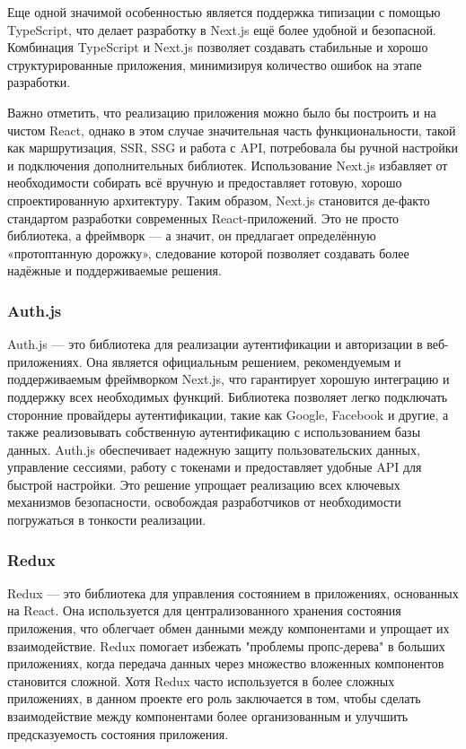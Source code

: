 Еще одной значимой особенностью является поддержка типизации с помощью TypeScript, что делает разработку в Next.js ещё более удобной и безопасной. Комбинация TypeScript и Next.js позволяет создавать стабильные и хорошо структурированные приложения, минимизируя количество ошибок на этапе разработки.

Важно отметить, что реализацию приложения можно было бы построить и на чистом React, однако в этом случае значительная часть функциональности, такой как маршрутизация, SSR, SSG и работа с API, потребовала бы ручной настройки и подключения дополнительных библиотек. Использование Next.js избавляет от необходимости собирать всё вручную и предоставляет готовую, хорошо спроектированную архитектуру. Таким образом, Next.js становится де-факто стандартом разработки современных React-приложений. Это не просто библиотека, а фреймворк — а значит, он предлагает определённую «протоптанную дорожку», следование которой позволяет создавать более надёжные и поддерживаемые решения.

\subsubsection*{Auth.js}
Auth.js --- это библиотека для реализации аутентификации и авторизации в веб-приложениях. Она является официальным решением, рекомендуемым и поддерживаемым фреймворком Next.js, что гарантирует хорошую интеграцию и поддержку всех необходимых функций. Библиотека позволяет легко подключать сторонние провайдеры аутентификации, такие как Google, Facebook и другие, а также реализовывать собственную аутентификацию с использованием базы данных. Auth.js обеспечивает надежную защиту пользовательских данных, управление сессиями, работу с токенами и предоставляет удобные API для быстрой настройки. Это решение упрощает реализацию всех ключевых механизмов безопасности, освобождая разработчиков от необходимости погружаться в тонкости реализации.

\subsubsection*{Redux}
Redux --- это библиотека для управления состоянием в приложениях, основанных на React. Она используется для централизованного хранения состояния приложения, что облегчает обмен данными между компонентами и упрощает их взаимодействие. Redux помогает избежать "проблемы пропс-дерева" в больших приложениях, когда передача данных через множество вложенных компонентов становится сложной. Хотя Redux часто используется в более сложных приложениях, в данном проекте его роль заключается в том, чтобы сделать взаимодействие между компонентами более организованным и улучшить предсказуемость состояния приложения.


